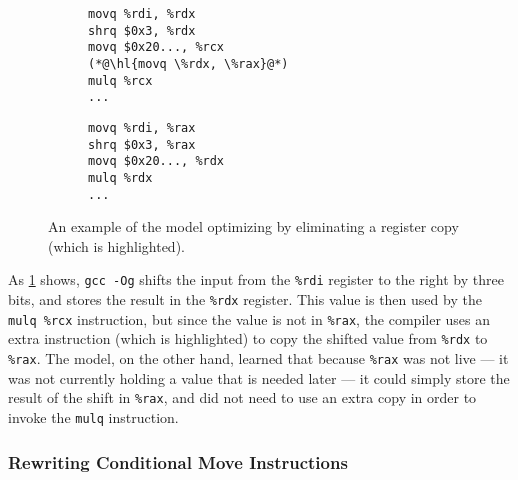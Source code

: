 \documentclass{article}
\begin{document}

\begin{figure}
    \begin{subfigure}[t]{\codeboxwidth}
    \begin{lstlisting}[language={[x64]Assembler}]
movq %rdi, %rdx
shrq $0x3, %rdx
movq $0x20..., %rcx
(*@\hl{movq \%rdx, \%rax}@*)
mulq %rcx
...
\end{lstlisting}
    \caption{\ogcodecaption}
    \end{subfigure}
    \hfil
%
    \begin{subfigure}[t]{\codeboxwidth}
    \begin{lstlisting}
movq %rdi, %rax
shrq $0x3, %rax
movq $0x20..., %rdx
mulq %rdx
...
\end{lstlisting}
    \caption{\modelcodecaption}
    \end{subfigure}
    \centering
    \caption{An example of the model optimizing by eliminating a register copy (which is highlighted).}
    \label{fig:elim_copy}

\end{figure}

As \cref{fig:elim_copy} shows,
\texttt{gcc -Og} shifts the input from the \lstinline{%rdi} register to the right by three bits, and stores the result in the \lstinline{%rdx} register.  This value is then used by the \lstinline{mulq %rcx} instruction, but since the value is not in \lstinline{%rax}, the compiler uses an extra instruction (which is highlighted) to copy the shifted value from \lstinline{%rdx} to \lstinline{%rax}.
%
The model, on the other hand, learned that because \lstinline{%rax} was not live --- it was not currently holding a value that is needed later --- it could simply store the result of the shift in \lstinline{%rax}, and did not need to use an extra copy in order to invoke the \lstinline{mulq} instruction.

\subsubsection{Rewriting Conditional Move Instructions}

\end{document}
